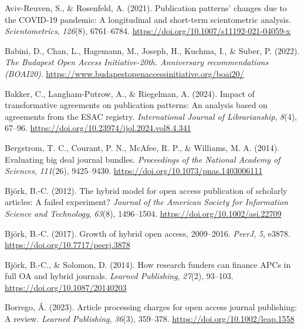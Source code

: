 \documentclass[a4paper,man,floatsintext,longtable,noextraspace,12pt]{apa6}
\newenvironment{CSLReferences}%
  {}%
  {\par}
\begin{document}
\hypertarget{refs}{}
\begin{CSLReferences}{1}{0}
\leavevmode{}%
Aviv-Reuven, S., \& Rosenfeld, A. (2021). Publication patterns' changes
due to the COVID-19 pandemic: A longitudinal and short-term
scientometric analysis. \emph{Scientometrics}, \emph{126}(8),
6761--6784. \url{https://doi.org/10.1007/s11192-021-04059-x}

\leavevmode{}%
Babini, D., Chan, L., Hagemann, M., Joseph, H., Kuchma, I., \& Suber, P.
(2022). \emph{{The Budapest Open Access Initiative-20th. Anniversary
recommendations (BOAI20)}}.
\url{https://www.budapestopenaccessinitiative.org/boai20/}

\leavevmode{}%
Bakker, C., Langham-Putrow, A., \& Riegelman, A. (2024). Impact of
transformative agreements on publication patterns: An analysis based on
agreements from the ESAC registry. \emph{International Journal of
Librarianship}, \emph{8}(4), 67--96.
\url{https://doi.org/10.23974/ijol.2024.vol8.4.341}

\leavevmode{}%
Bergstrom, T. C., Courant, P. N., McAfee, R. P., \& Williams, M. A.
(2014). Evaluating big deal journal bundles. \emph{Proceedings of the
National Academy of Sciences}, \emph{111}(26), 9425--9430.
\url{https://doi.org/10.1073/pnas.1403006111}

\leavevmode{}%
Björk, B.-C. (2012). The hybrid model for open access publication of
scholarly articles: A failed experiment? \emph{Journal of the American
Society for Information Science and Technology}, \emph{63}(8),
1496--1504. \url{https://doi.org/10.1002/asi.22709}

\leavevmode{}%
Björk, B.-C. (2017). Growth of hybrid open access, 2009--2016.
\emph{PeerJ}, \emph{5}, e3878. \url{https://doi.org/10.7717/peerj.3878}

\leavevmode{}%
Björk, B.-C., \& Solomon, D. (2014). How research funders can finance
APCs in full OA and hybrid journals. \emph{Learned Publishing},
\emph{27}(2), 93--103. \url{https://doi.org/10.1087/20140203}

\leavevmode{}%
Borrego, Á. (2023). Article processing charges for open access journal
publishing: A review. \emph{Learned Publishing}, \emph{36}(3), 359--378.
\url{https://doi.org/10.1002/leap.1558}


\end{CSLReferences}
\end{document}
